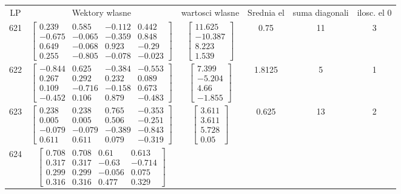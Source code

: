 \documentclass[a4paper,12pt]{article}
\begin{document}
\bgroup {} \vspace{0.2in} \begin{tabular}{c c c c c c}
LP &Wektory wlasne & wartosci wlasne & Srednia el & suma diagonali & ilosc. el 0\\
621
&
$\begin{bmatrix} 0.239 & 0.585 & -0.112 & 0.442 \\ -0.675 & -0.065 & -0.359 & 0.848 \\ 0.649 & -0.068 & 0.923 & -0.29 \\ 0.255 & -0.805 & -0.078 & -0.023 \end{bmatrix}$
&
$\begin{bmatrix} 11.625 \\ -10.387 \\ 8.223 \\ 1.539 \end{bmatrix}$
&
0.75
&
11
&
3
\\
622
&
$\begin{bmatrix} -0.844 & 0.625 & -0.384 & -0.553 \\ 0.267 & 0.292 & 0.232 & 0.089 \\ 0.109 & -0.716 & -0.158 & 0.673 \\ -0.452 & 0.106 & 0.879 & -0.483 \end{bmatrix}$
&
$\begin{bmatrix} 7.399 \\ -5.204 \\ 4.66 \\ -1.855 \end{bmatrix}$
&
1.8125
&
5
&
1
\\
623
&
$\begin{bmatrix} 0.238 & 0.238 & 0.765 & -0.353 \\ 0.005 & 0.005 & 0.506 & -0.251 \\ -0.079 & -0.079 & -0.389 & -0.843 \\ 0.611 & 0.611 & 0.079 & -0.319 \end{bmatrix}$
&
$\begin{bmatrix} 3.611 \\ 3.611 \\ 5.728 \\ 0.05 \end{bmatrix}$
&
0.625
&
13
&
2
\\
624
&
$\begin{bmatrix} 0.708 & 0.708 & 0.61 & 0.613 \\ 0.317 & 0.317 & -0.63 & -0.714 \\ 0.299 & 0.299 & -0.056 & 0.075 \\ 0.316 & 0.316 & 0.477 & 0.329 \end{bmatrix}$

\end{tabular}
\end{document}
